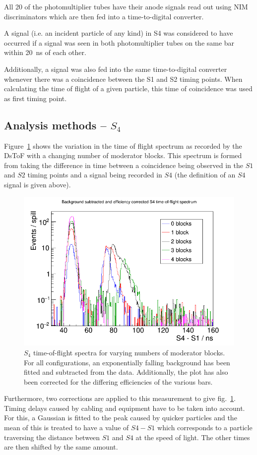     All 20 of the photomultiplier tubes have their anode signals read out using NIM discriminators which are then fed into a time-to-digital converter. 
    
    A signal (i.e. an incident particle of any kind) in S4 was considered to have occurred if a signal was seen in both photomultiplier tubes on the same bar within 20~ns of each other.
    
    Additionally, a signal was also fed into the same time-to-digital converter whenever there was a coincidence between the S1 and S2 timing points. When calculating the time of flight of a given particle, this time of coincidence was used as first timing point.
    
	\subsection{Analysis methods -- $S_{4}$}

	Figure~\ref{fig:s4tof} shows the variation in the time of flight spectrum as recorded by the DsToF with a changing number of moderator blocks. This spectrum is formed from taking the difference in time between a coincidence being observed in the $S1$ and $S2$ timing points and a signal being recorded in $S4$ (the definition of an $S4$ signal is given above).
	
	\begin{figure}[h]
		\centering
		\includegraphics[width=0.7\linewidth]{files/Figures/s4ToF_axisAdj.png}
		\caption{$S_{4}$ time-of-flight spectra for varying numbers of moderator blocks. For all configurations, an exponentially falling background has been fitted and subtracted from the data. Additionally, the plot has also been corrected for the differing efficiencies of the various bars.}
		\label{fig:s4tof}	
	\end{figure}

	Furthermore, two corrections are applied to this measurement to give fig.~\ref{fig:s4tof}. Timing delays caused by cabling and equipment have to be taken into account. For this, a Gaussian is fitted to the peak caused by quicker particles and the mean of this is treated to have a value of $S4 - S1$ which corresponds to a particle traversing the distance between $S1$ and $S4$ at the speed of light. The other times are then shifted by the same amount.
	
